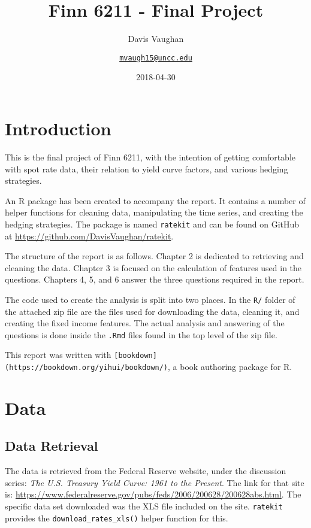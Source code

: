 \documentclass[openany]{book}
\title{Finn 6211 - Final Project}
\subtitle{Davis Vaughan}
\author{\href{mailto:mvaugh15@uncc.edu}{\nolinkurl{mvaugh15@uncc.edu}}}
\date{2018-04-30}
\theoremstyle{definition}
\theoremstyle{definition}
\theoremstyle{definition}
\theoremstyle{remark}
\begin{document}
\maketitle

{
\setcounter{tocdepth}{1}
\tableofcontents
}
\hypertarget{titlepage}{%
\chapter{Introduction}\label{titlepage}}

This is the final project of Finn 6211, with the intention of getting
comfortable with spot rate data, their relation to yield curve factors,
and various hedging strategies.

An R package has been created to accompany the report. It contains a
number of helper functions for cleaning data, manipulating the time
series, and creating the hedging strategies. The package is named
\texttt{ratekit} and can be found on GitHub at
\url{https://github.com/DavisVaughan/ratekit}.

The structure of the report is as follows. Chapter 2 is dedicated to
retrieving and cleaning the data. Chapter 3 is focused on the
calculation of features used in the questions. Chapters 4, 5, and 6
answer the three questions required in the report.

The code used to create the analysis is split into two places. In the
\texttt{R/} folder of the attached zip file are the files used for
downloading the data, cleaning it, and creating the fixed income
features. The actual analysis and answering of the questions is done
inside the \texttt{.Rmd} files found in the top level of the zip file.

This report was written with
\texttt{{[}bookdown{]}(https://bookdown.org/yihui/bookdown/)}, a book
authoring package for R.

\small

\normalsize

\hypertarget{data}{%
\chapter{Data}\label{data}}

\hypertarget{retrieve}{%
\section{Data Retrieval}\label{retrieve}}

The data is retrieved from the Federal Reserve website, under the
discussion series: \emph{The U.S. Treasury Yield Curve: 1961 to the
Present}. The link for that site is:
\url{https://www.federalreserve.gov/pubs/feds/2006/200628/200628abs.html}.
The specific data set downloaded was the XLS file included on the site.
\texttt{ratekit} provides the \texttt{download\_rates\_xls()} helper
function for this.
\end{document}
